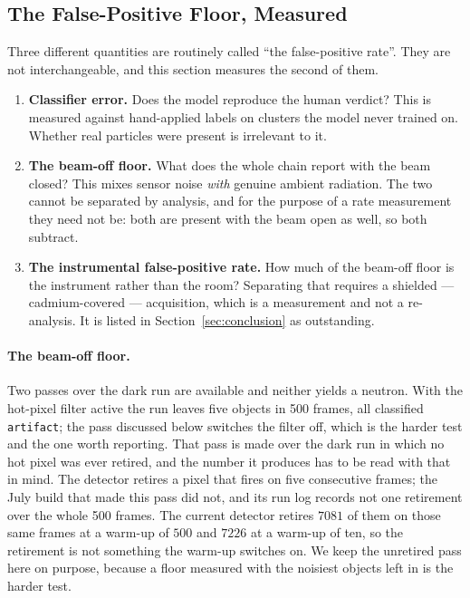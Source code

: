 \documentclass[a4paper,headsepline,oneside,11pt]{scrartcl}
\begin{document}
\subsection{The False-Positive Floor, Measured}
\label{sec:results_falsepositives}

Three different quantities are routinely called ``the false-positive rate''.
They are not interchangeable, and this section measures the second of them.

\begin{enumerate}
  \item \textbf{Classifier error.} Does the model reproduce the human verdict?
  This is measured against hand-applied labels on clusters the model never
  trained on. Whether real particles were present is irrelevant to it.
  \item \textbf{The beam-off floor.} What does the whole chain report with the
  beam closed? This mixes sensor noise \emph{with} genuine ambient radiation.
  The two cannot be separated by analysis, and for the purpose of a rate
  measurement they need not be: both are present with the beam open as well, so
  both subtract.
  \item \textbf{The instrumental false-positive rate.} How much of the beam-off
  floor is the instrument rather than the room? Separating that requires a
  shielded --- cadmium-covered --- acquisition, which is a measurement and not a
  re-analysis. It is listed in Section~\ref{sec:conclusion} as outstanding.
\end{enumerate}

\paragraph{The beam-off floor.} Two passes over the dark run are available and
neither yields a neutron. With the hot-pixel filter active the run leaves five
objects in 500 frames, all classified \texttt{artifact}; the pass discussed
below switches the filter off, which is the harder test and the one worth
reporting. That pass is made over the dark
run in which no hot pixel was ever retired, and the number it produces has to be
read with that in mind. The detector retires a pixel that fires on five
consecutive frames; the July build that made this pass did not, and its run log
records not one retirement over the whole 500 frames. The current detector
retires $7081$ of them on those same frames at a warm-up of $500$ and
$7226$ at a warm-up of ten, so the retirement is not something the warm-up
switches on. We keep the unretired pass here on purpose, because a floor
measured with the noisiest objects left in is the harder test.
\end{document}
